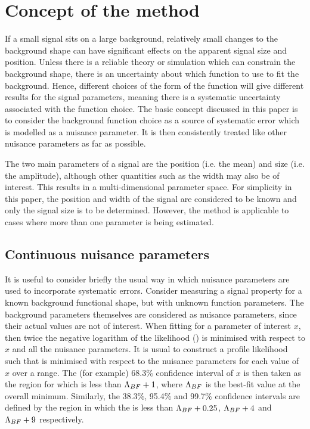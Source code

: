 \section{Concept of the method} %
\label{sec:concept}

If a small signal sits on
a large background, relatively small changes to the background shape can
have significant effects on the apparent signal size and position.
Unless there is a
reliable theory or simulation which can constrain the background shape,
there is an uncertainty about which function to use to fit
the background. Hence, different choices of the form of the function
will give different results for the signal parameters, meaning there is a
systematic uncertainty associated with the function choice.
The basic concept discussed in this paper is to consider the background
function choice as a source of systematic error which is modelled as a nuisance parameter.
It is then consistently treated like other nuisance parameters as far as
possible.

The two main parameters of a signal are the position (i.e. the mean)
and size (i.e. the amplitude), although other
quantities such as the width may also be of interest. This results in a
multi-dimensional parameter space. For simplicity in this paper, the position
and width of the signal are considered to be known and only the signal
size is to be determined. However, the method is applicable to
cases where more than one parameter is being estimated.

\subsection{Continuous nuisance parameters}
\label{sec:concept:continuous}

It is useful to consider briefly the usual way in which nuisance 
parameters are used to incorporate systematic errors. Consider measuring a signal
property for a known background functional shape, but with unknown function
parameters. The background parameters themselves are considered as
nuisance parameters, since their actual values are not of interest.
When fitting for a parameter of interest $x$, then twice the negative logarithm of the
likelihood (\nll) is minimised with respect to $x$ and all the
nuisance parameters. It is usual to construct a profile likelihood
such that \nll is minimised with respect to the nuisance parameters 
for each value of $x$ over a range. 
The (for example) 68.3\% confidence interval of $x$ 
is then
taken as the region for which \nll is less than ${\rm \Lambda}_{BF}+1$,
where ${\rm \Lambda}_{BF}$ is the best-fit value at the overall minimum. 
Similarly, the 38.3\%, 95.4\% and 99.7\% confidence intervals are defined by the 
region in which the \nll is less than ${\rm \Lambda}_{BF}+0.25$, ${\rm \Lambda}_{BF}+4$ 
and ${\rm \Lambda}_{BF}+9$ respectively. 


